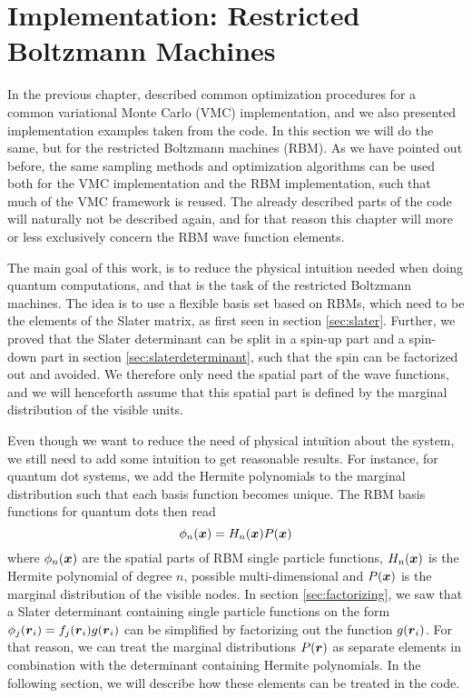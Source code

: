\chapter{Implementation: Restricted Boltzmann Machines} \label{chp:rbmimplementation}
In the previous chapter, described common optimization procedures for a common variational Monte Carlo (VMC) implementation, and we also presented implementation examples taken from the code. In this section we will do the same, but for the restricted Boltzmann machines (RBM). As we have pointed out before, the same sampling methods and optimization algorithms can be used both for the VMC implementation and the RBM implementation, such that much of the VMC framework is reused. The already described parts of the code will naturally not be described again, and for that reason this chapter will more or less exclusively concern the RBM wave function elements.

The main goal of this work, is to reduce the physical intuition needed when doing quantum computations, and that is the task of the restricted Boltzmann machines. The idea is to use a flexible basis set based on RBMs, which need to be the elements of the Slater matrix, as first seen in section \ref{sec:slater}. Further, we proved that the Slater determinant can be split in a spin-up part and a spin-down part in section \ref{sec:slaterdeterminant}, such that the spin can be factorized out and avoided. We therefore only need the spatial part of the wave functions, and we will henceforth assume that this spatial part is defined by the marginal distribution of the visible units. 

Even though we want to reduce the need of physical intuition about the system, we still need to add some intuition to get reasonable results. For instance, for quantum dot systems, we add the Hermite polynomials to the marginal distribution such that each basis function becomes unique. The RBM basis functions for quantum dots then read
\begin{equation}
\phi_n(\boldsymbol{{x}})=H_n(\boldsymbol{{x}})P(\boldsymbol{{x}})
\end{equation}
where $\phi_n(\boldsymbol{{x}})$ are the spatial parts of RBM single particle functions, $H_n(\boldsymbol{{x}})$ is the Hermite polynomial of degree $n$, possible multi-dimensional and $P(\boldsymbol{{x}})$ is the marginal distribution of the visible nodes. In section \ref{sec:factorizing}, we saw that a Slater determinant containing single particle functions on the form $\phi_j(\boldsymbol{{r}}_i)=f_j(\boldsymbol{{r}}_i)g(\boldsymbol{{r}}_i)$ can be simplified by factorizing out the function $g(\boldsymbol{{r}}_i)$. For that reason, we can treat the marginal distributions $P(\boldsymbol{{r}})$ as separate elements in combination with the determinant containing Hermite polynomials. In the following section, we will describe how these elements can be treated in the code. 

